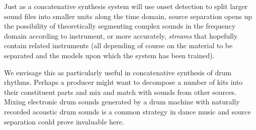 Just as a concatenative synthesis system will use onset detection to split larger sound files into smaller units along the time domain, source separation opens up the possibility of theoretically segmenting complex sounds in the frequency domain according to instrument, or more accurately, \textit{streams} that hopefully contain related instruments (all depending of course on the material to be separated and the models upon which the system has been trained).

We envisage this as particularly useful in concatenative synthesis of drum rhythms. Perhaps a producer might want to decompose a number of kits into their constituent parts and mix and match with sounds from other sources. Mixing electronic drum sounds generated by a drum machine with naturally recorded acoustic drum sounds is a common strategy in dance music and source separation could prove invaluable here.


\newpage
\thispagestyle{empty}
\mbox{}

